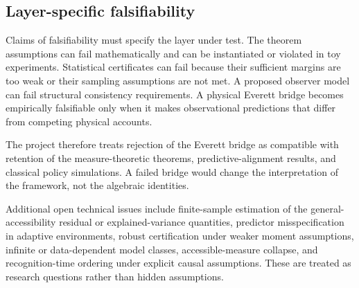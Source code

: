 \subsection{Layer-specific falsifiability}

Claims of falsifiability must specify the layer under test. The theorem assumptions can fail mathematically and can be instantiated or violated in toy experiments. Statistical certificates can fail because their sufficient margins are too weak or their sampling assumptions are not met. A proposed observer model can fail structural consistency requirements. A physical Everett bridge becomes empirically falsifiable only when it makes observational predictions that differ from competing physical accounts.

The project therefore treats rejection of the Everett bridge as compatible with retention of the measure-theoretic theorems, predictive-alignment results, and classical policy simulations. A failed bridge would change the interpretation of the framework, not the algebraic identities.

Additional open technical issues include finite-sample estimation of the general-accessibility residual or explained-variance quantities, predictor misspecification in adaptive environments, robust certification under weaker moment assumptions, infinite or data-dependent model classes, accessible-measure collapse, and recognition-time ordering under explicit causal assumptions. These are treated as research questions rather than hidden assumptions.
